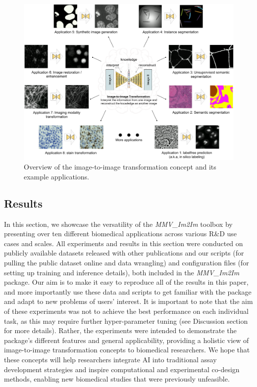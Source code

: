 \begin{figure}
\hypertarget{fig:overview}{%
\centering
\includegraphics[width=1\textwidth,height=0.53\textheight]{images/overview_figure.png}
\caption{Overview of the image-to-image transformation concept and its example applications.}\label{fig:overview}
}
\end{figure}

\hypertarget{results}{%
\subsection{Results}\label{results}}

In this section, we showcase the versatility of the \emph{MMV\_Im2Im} toolbox by presenting over ten different biomedical applications across various R\&D use cases and scales. All experiments and results in this section were conducted on publicly available datasets released with other publications and our scripts (for pulling the public dataset online and data wrangling) and configuration files (for setting up training and inference details), both included in the \emph{MMV\_Im2Im} package. Our aim is to make it easy to reproduce all of the results in this paper, and more importantly use these data and scripts to get familiar with the package and adapt to new problems of users' interest. It is important to note that the aim of these experiments was not to achieve the best performance on each individual task, as this may require further hyper-parameter tuning (see Discussion section for more details). Rather, the experiments were intended to demonstrate the package's different features and general applicability, providing a holistic view of image-to-image transformation concepts to biomedical researchers. We hope that these concepts will help researchers integrate AI into traditional assay development strategies and inspire computational and experimental co-design methods, enabling new biomedical studies that were previously unfeasible.

